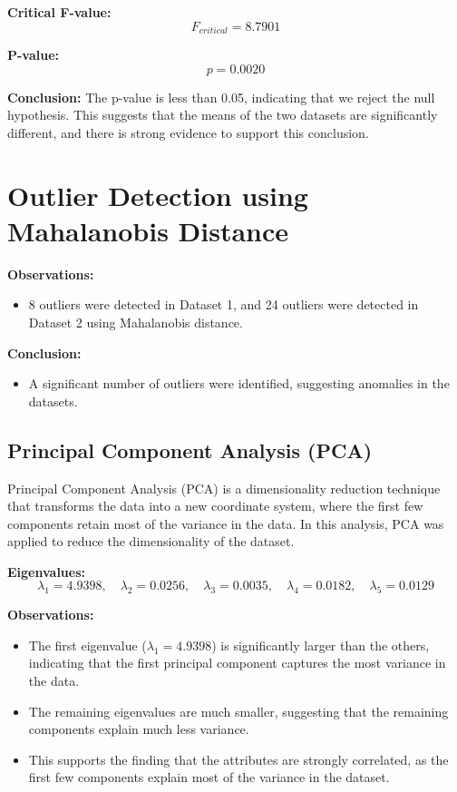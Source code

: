 \documentclass[11pt]{article}
\begin{document}
\textbf{Critical F-value:}
\[
F_{critical} = 8.7901
\]

\textbf{P-value:}
\[
p = 0.0020
\]

\textbf{Conclusion:}
The p-value is less than 0.05, indicating that we reject the null hypothesis. This suggests that the means of the two datasets are significantly different, and there is strong evidence to support this conclusion.


\section{Outlier Detection using Mahalanobis Distance}
\textbf{Observations:}
\begin{itemize}
    \item 8 outliers were detected in Dataset 1, and 24 outliers were detected in Dataset 2 using Mahalanobis distance.
\end{itemize}
\textbf{Conclusion:}
\begin{itemize}
    \item A significant number of outliers were identified, suggesting anomalies in the datasets.
\end{itemize}

\subsection{Principal Component Analysis (PCA)}

Principal Component Analysis (PCA) is a dimensionality reduction technique that transforms the data into a new coordinate system, where the first few components retain most of the variance in the data. In this analysis, PCA was applied to reduce the dimensionality of the dataset.

\textbf{Eigenvalues:}
\[
\lambda_1 = 4.9398, \quad \lambda_2 = 0.0256, \quad \lambda_3 = 0.0035, \quad \lambda_4 = 0.0182, \quad \lambda_5 = 0.0129
\]

\textbf{Observations:}
\begin{itemize}
    \item The first eigenvalue (\( \lambda_1 = 4.9398 \)) is significantly larger than the others, indicating that the first principal component captures the most variance in the data.
    \item The remaining eigenvalues are much smaller, suggesting that the remaining components explain much less variance.
    \item This supports the finding that the attributes are strongly correlated, as the first few components explain most of the variance in the dataset.
\end{itemize}
\end{document}

